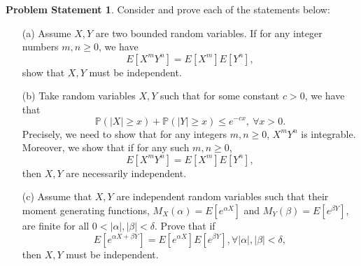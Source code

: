 \documentclass[12pt,reqno]{article}
\theoremstyle{plain}
\theoremstyle{definition}
\newtheorem{problem}[theorem]{Problem Statement}
\newcommand{\PP}[1]{\ensuremath{\mathbb{P}\left(#1\right)}}
\begin{document}
\begin{problem}
Consider and prove each of the statements below:
\begin{itemize} 

\item[(a)] Assume $X,Y$ are two bounded random variables. If for any integer 
     numbers $m,n \geq 0$, we have 
     \[
     E[X^mY^n] = E[X^m] E[Y^n], 
     \]
     show that $X,Y$ must be independent. 
\item[(b)] Take random variables $X,Y$ such that for some 
     constant $c > 0$, we have that 
     \[
     \PP{|X| \geq x} + \PP{|Y| \geq x} \leq e^{-cx},\ \forall x > 0. 
     \]
     Precisely, we need to show that for any integers $m,n \geq 0$, 
     $X^mY^n$ is integrable. Moreover, we show that if for any such 
     $m,n \geq 0$, 
     \[
     E[X^mY^n] = E[X^m] E[Y^n], 
     \]
     then $X,Y$ are necessarily independent. 
\item[(c)] Assume that $X,Y$ are independent random variables such that 
     their moment generating functions, $M_X(\alpha) = E[e^{\alpha X}]$ and 
     $M_Y(\beta) = E[e^{\beta Y}]$, are finite for all 
     $0 < |\alpha|,|\beta| < \delta$. Prove that if 
     \[
     E[e^{\alpha X+\beta Y}] = E[e^{\alpha X}] E[e^{\beta Y}], 
          \forall |\alpha|,|\beta| < \delta, 
     \]
     then $X,Y$ must be independent. 

\end{itemize} 
\end{problem} 
\end{document}
